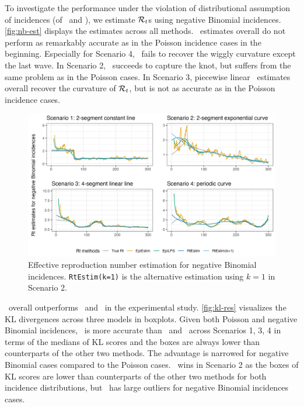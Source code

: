 To investigate the performance under the violation of distributional assumption
of incidences (of \RtEstim\ and \EpiEstim), we estimate $\mathcal{R}_t$s using
negative Binomial incidences. \autoref{fig:nb-est} displays the estimates across
all methods. \RtEstim\ estimates overall do not perform as remarkably accurate
as in the Poisson incidence cases in the beginning. Especially for Scenario 4,
\RtEstim\ fails to recover the wiggly curvature except the last wave. In
Scenario 2, \RtEstim\ succeeds to capture the knot, but suffers from the same
problem as in the Poisson cases. In Scenario 3, piecewise linear \RtEstim\
estimates overall recover the curvature of $\mathcal{R}_t$, but is not as accurate as
in the Poisson incidence cases.

\begin{figure}[tb]
    \centering
    \includegraphics*[width=.9\textwidth]{fig/NB-res-plot.png}
    \caption{Effective reproduction number estimation for negative Binomial incidences. \texttt{RtEstim(k=1)} is the alternative estimation using $k=1$ in Scenario 2.}
    \label{fig:nb-est}
\end{figure}

\RtEstim\ overall outperforms \EpiEstim\ and \EpiLPS\ in the experimental study.
\autoref{fig:kl-res} visualizes the KL divergences across three models in
boxplots. Given both Poisson and negative Binomial incidences, \RtEstim\ is more
accurate than \EpiEstim\ and \EpiLPS\ across Scenarios 1, 3, 4 in terms of the
medians of KL scores and the boxes are always lower than counterparts of the
other two methods. The advantage is narrowed for negative Binomial cases
compared to the Poisson cases. \EpiLPS\ wins in Scenario 2 as the boxes of KL
scores are lower than counterparts of the other two methods for both incidence
distributions, but \EpiLPS\ has large outliers for negative Binomial incidences
cases. 

